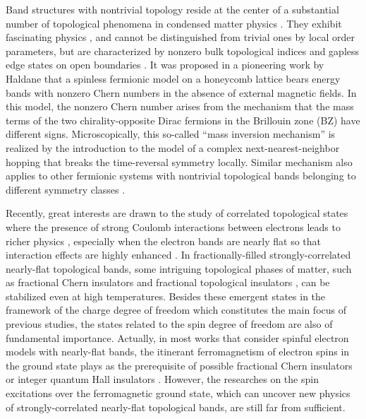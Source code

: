 \documentclass[amsmath,superscriptaddress,showpacs,aps,prl,twocolumn]{revtex4-1}
\begin{document}
\par Band structures with nontrivial topology reside at the center of a substantial number of topological phenomena in condensed matter physics \cite{Hasan_RMP2010,Qi_RMP2011,Bansil_RMP2016}. They exhibit fascinating physics \cite{Chiu_RMP2016,Zeng_B2019}, and cannot be distinguished from trivial ones by local order parameters, but are characterized by nonzero bulk topological indices and gapless edge states on open boundaries \cite{Laughlin_PRB1981,Halperin_PRB1982,Kane_PRL2005a,Bernevig_S2006,Yu_PRL2011}. It was proposed in a pioneering work by Haldane \cite{Haldane_PRL1988} that a spinless fermionic model on a honeycomb lattice bears energy bands with nonzero Chern numbers \cite{Thouless_PRL1982,Simon_PRL1983} in the absence of external magnetic fields. In this model, the nonzero Chern number arises from the mechanism that the mass terms of the two chirality-opposite Dirac fermions in the Brillouin zone (BZ) have different signs. Microscopically, this so-called ``mass inversion mechanism'' is realized by the introduction to the model of a complex next-nearest-neighbor hopping that breaks the time-reversal symmetry locally. Similar mechanism also applies to other fermionic systems with nontrivial topological bands belonging to different symmetry classes \cite{Kane_PRL2005}.

\par Recently, great interests are drawn to the study of correlated topological states where the presence of strong Coulomb interactions between electrons leads to richer physics \cite{Hohenadler_JPCM2013,Wen_RMP2017,Rachel_RPP2018}, especially when the electron bands are nearly flat so that interaction effects are highly enhanced \cite{Neupert_PS2015}. In fractionally-filled strongly-correlated nearly-flat topological bands, some intriguing topological phases of matter, such as fractional Chern insulators \cite{Tang_PRL2011,Wang_PRB2011,Sun_PRL2011,Wang_PRL2011,Neupert_PRL2011,Sheng_NC2011,Regnault_PRX2011} and fractional topological insulators \cite{Neupert_PRB2011}, can be stabilized even at high temperatures. Besides these emergent states in the framework of the charge degree of freedom which constitutes the main focus of previous studies, the states related to the spin degree of freedom are also of fundamental importance. Actually, in most works that consider spinful electron models with nearly-flat bands, the itinerant ferromagnetism \cite{Tasaki_PRL1992,Mielke_PLA1993,Mielke_CMP1993} of electron spins in the ground state plays as the prerequisite of possible fractional Chern insulators \cite{Tang_PRL2011,Wang_PRB2011,Sun_PRL2011} or integer quantum Hall insulators \cite{Neupert_PRL2012}. However, the researches \cite{Doretto_PRB2015,Su_PRB2019} on the spin excitations over the ferromagnetic ground state, which can uncover new physics of strongly-correlated nearly-flat topological bands, are still far from sufficient.
\end{document}
